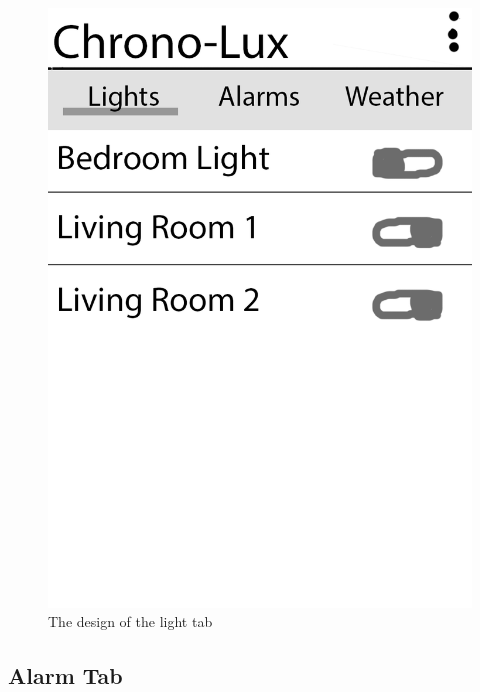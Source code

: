 \begin{figure}[H]
\centering
\includegraphics[scale=0.2]{Images/designs/AppDesign_04.png}
\caption{The design of the light tab}
\end{figure}

\subsection{Alarm Tab}

